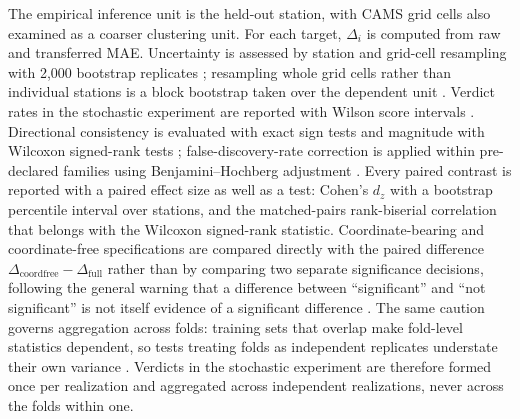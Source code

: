 The empirical inference unit is the held-out station, with CAMS grid cells also examined as a coarser clustering unit. For each target, $\Delta_i$ is computed from raw and transferred MAE. Uncertainty is assessed by station and grid-cell resampling with 2,000 bootstrap replicates \citep{efron1979}; resampling whole grid cells rather than individual stations is a block bootstrap taken over the dependent unit \citep{kunsch1989,politis1994}. Verdict rates in the stochastic experiment are reported with Wilson score intervals \citep{wilson1927}. Directional consistency is evaluated with exact sign tests and magnitude with Wilcoxon signed-rank tests \citep{wilcoxon1945}; false-discovery-rate correction is applied within pre-declared families using Benjamini--Hochberg adjustment \citep{benjamini1995}. Every paired contrast is reported with a paired effect size as well as a test: Cohen's $d_z$ with a bootstrap percentile interval over stations, and the matched-pairs rank-biserial correlation that belongs with the Wilcoxon signed-rank statistic. Coordinate-bearing and coordinate-free specifications are compared directly with the paired difference $\Delta_{\mathrm{coordfree}}-\Delta_{\mathrm{full}}$ rather than by comparing two separate significance decisions, following the general warning that a difference between ``significant'' and ``not significant'' is not itself evidence of a significant difference \citep{gelman2006}. The same caution governs aggregation across folds: training sets that overlap make fold-level statistics dependent, so tests treating folds as independent replicates understate their own variance \citep{dietterich1998,nadeau2003}. Verdicts in the stochastic experiment are therefore formed once per realization and aggregated across independent realizations, never across the folds within one.

